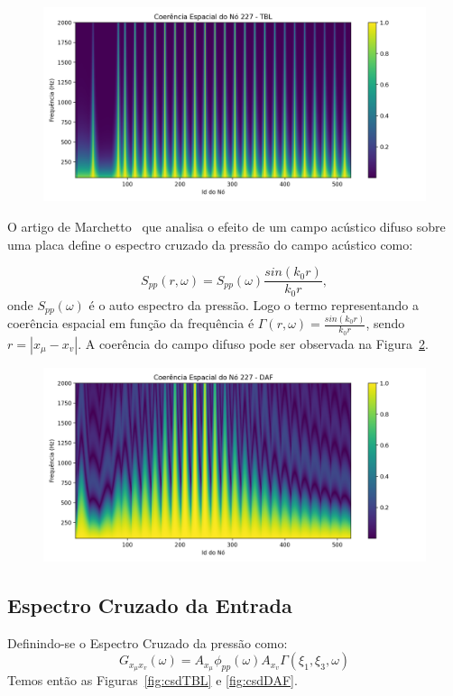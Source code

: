 \documentclass[9pt,a4paper,twoside]{rho-class/rho}
\begin{document}
\begin{figure}[H]
	\centering
	\includegraphics[width=0.9\columnwidth]{figures/coer_TBL.png}
	\caption{}
	\label{fig:coerTBL}
\end{figure}
O artigo de Marchetto~\cite{marchettoVibroacousticResponsePanels2017} que analisa o efeito de um campo acústico difuso sobre uma placa define o espectro cruzado da pressão do campo acústico como:

\begin{equation}
	S_{pp}(r,\omega) = S_{pp}(\omega) \frac{sin(k_0r)}{k_0r},
\end{equation}
onde $S_{pp}(\omega)$ é o auto espectro da pressão. Logo o termo representando a coerência espacial em função da frequência é $\Gamma(r,\omega) = \frac{sin(k_0r)}{k_0r}$, sendo $r = |x_\mu - x_v|$. A coerência do campo difuso pode ser observada na Figura~\ref{fig:coerDAF}.

\begin{figure}[H]
	\centering
	\includegraphics[width=0.9\columnwidth]{figures/coer_DAF.png}
	\caption{}
	\label{fig:coerDAF}
\end{figure}
\vfill
\subsection{Espectro Cruzado da Entrada}
Definindo-se o Espectro Cruzado da pressão como: 
\begin{equation}
	G_{x_\mu x_v}(\omega)=A_{x_\mu}\phi_{pp}(\omega)A_{x_v}\Gamma(\xi_1,\xi_3,\omega)
\end{equation}
Temos então as Figuras~\ref{fig:csdTBL} e \ref{fig:csdDAF}.
\end{document}
